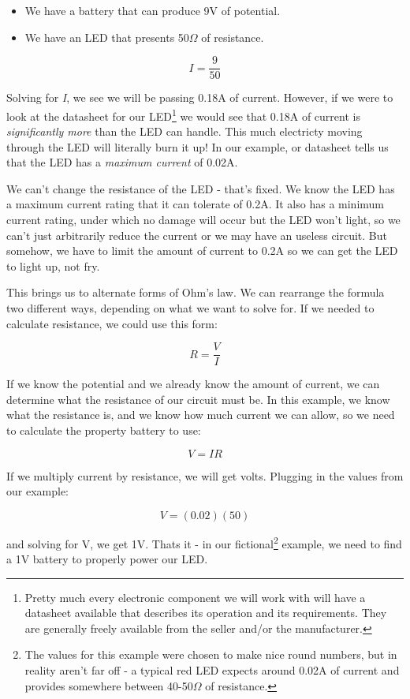 \documentclass[10pt]{report}
\begin{document}
\begin{itemize}
\item We have a battery that can produce 9V of potential.
\item We have an LED that presents 50$\Omega$ of resistance.
\end{itemize}

\begin{equation}
I = \frac{9}{50}
\end{equation}

Solving for \textit{I}, we see we will be passing 0.18A of current. However, if we were to look at the datasheet for our LED\footnote{Pretty much every electronic component we will work with will have a datasheet available that describes its operation and its requirements. They are generally freely available from the seller and/or the manufacturer.} we would see that 0.18A of current is \textit{significantly more} than the LED can handle. This much electricty moving through the LED will literally burn it up! In our example, or datasheet tells us that the LED has a \textit{maximum current} of 0.02A. 

We can't change the resistance of the LED - that's fixed. We know the LED has a maximum current rating that it can tolerate of 0.2A. It also has a minimum current rating, under which no damage will occur but the LED won't light, so we can't just arbitrarily reduce the current or we may have an useless circuit. But somehow, we have to limit the amount of current to 0.2A so we can get the LED to light up, not fry.

This brings us to alternate forms of Ohm's law. We can rearrange the formula two different ways, depending on what we want to solve for. If we needed to calculate resistance, we could use this form:

\begin{equation}
R = \frac{V}{I}
\end{equation}

If we know the potential and we already know the amount of current, we can determine what the resistance of our circuit must be. In this example, we know what the resistance is, and we know how much current we can allow, so we need to calculate the property battery to use:

\begin{equation}
V = IR
\end{equation}

If we multiply current by resistance, we will get volts. Plugging in the values from our example:

\begin{equation}
V = (0.02)(50)
\end{equation}

and solving for V, we get 1V. Thats it - in our fictional\footnote{The values for this example were chosen to make nice round numbers, but in reality aren't far off - a typical red LED expects around 0.02A of current and provides somewhere between 40-50$\Omega$ of resistance.} example, we need to find a 1V battery to properly power our LED.
\end{document}

